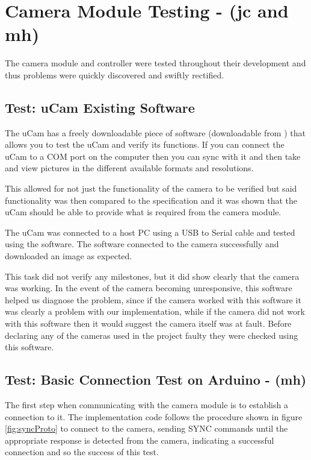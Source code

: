 \section{Camera Module Testing - (jc and mh)}

The camera module and controller were tested throughout their development and thus problems were quickly discovered and swiftly rectified.

\subsection{Test: uCam Existing Software}
\label{sec:existing_software_test}

The uCam has a freely downloadable piece of software (downloadable from \cite{ucam_test_software}) that allows you to test the uCam and verify its functions. If you can connect the uCam to a COM port on the computer then you can sync with it and then take and view pictures in the different available formats and resolutions.

This allowed for not just the functionality of the camera to be verified but said functionality was then compared to the specification and it was shown that the uCam should be able to provide what is required from the camera module.

The uCam was connected to a host PC using a USB to Serial cable and tested using the software. The software connected to the camera successfully and downloaded an image as expected.

This task did not verify any milestones, but it did show clearly that the camera was working. In the event of the camera becoming unresponsive, this software helped us diagnose the problem, since if the camera worked with this software it was clearly a problem with our implementation, while if the camera did not work with this software then it would suggest the camera itself was at fault. Before declaring any of the cameras used in the project faulty they were checked using this software.

\subsection{Test: Basic Connection Test on Arduino - (mh)}
\label{sec:basic_connection_test}

The first step when communicating with the camera module is to establish a connection to it.  The implementation code follows the procedure shown in figure \ref{fig:syncProto} to connect to the camera, sending SYNC commands until the appropriate response is detected from the camera, indicating a successful connection and so the success of this test.

